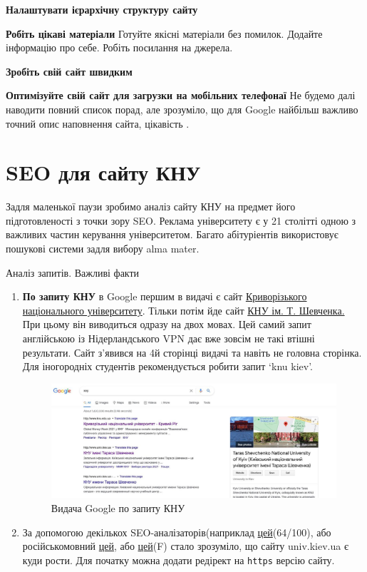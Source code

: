 \documentclass[a4paper,12pt, titlepage]{article}
\begin{document}
    \item \textbf{Налаштувати ієрархічну структуру сайту}
    \item \textbf{Робіть цікаві матеріали}
    Готуйте якісні матеріали без помилок. Додайте інформацію про себе.
    Робіть посилання на джерела.
    \item \textbf{Зробіть свій сайт швидким}
    \item \textbf{Оптимізуйте свій сайт для загрузки на мобільних телефонаї}
    Не будемо далі наводити повний список порад, але зрозуміло, що для Google найбільш важливо точний опис наповнення
    сайта, цікавість .

    \section{SEO для сайту КНУ}
    Задля маленької паузи зробимо аналіз сайту КНУ на предмет його підготовленості з точки зору SEO.
    Реклама університету є у 21 столітті одною з важливих частин керування університетом.
    Багато абітуріентів використовує пошукові системи задля вибору alma mater.


    Аналіз запитів. Важливі факти
    \begin{enumerate}
        \item \textbf{По запиту КНУ} в Google першим в видачі є сайт \href{http://www.knu.edu.ua/}{Криворізького національного університету}.
        Тільки потім йде сайт \href{http://www.univ.kiev.ua/}{КНУ ім. Т. Шевченка.} При цьому він виводиться одразу на двох мовах.
        Цей самий запит англійською із Нідерландського VPN дає вже зовсім не такі втішні результати.
        Сайт з'явився на 4й сторінці видачі та навіть не головна сторінка. Для іногородніх студентів рекомендується робити запит `knu kiev'.
        \begin{figure}
            \includegraphics[scale=0.35, left]{knu_search.jpg}
            \caption{Видача Google по запиту КНУ}
        \end{figure}

        \item За допомогою декількох SEO-аналізаторів(наприклад \href{https://sitechecker.pro/}{цей}(64/100), або російськомовний \href{https://seo.analizsaita.online/}{цей}, або \href{https://www.seoptimer.com}{цей}(F) стало зрозуміло,
        що сайту univ.kiev.ua є куди рости. Для початку можна додати редірект на \texttt{https} версію сайту.
    \end{enumerate}
\end{document}
